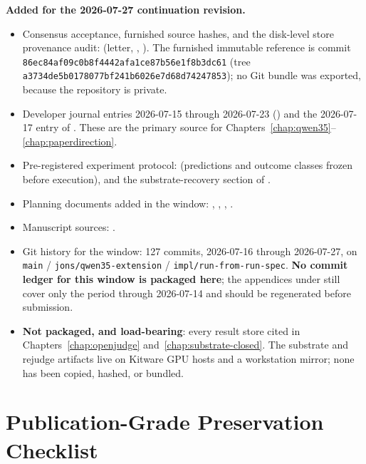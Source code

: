 \documentclass[11pt]{report}
\newcommand{\code}[1]{\texttt{#1}}
\begin{document}
\noindent\textbf{Added for the 2026-07-27 continuation revision.}
\begin{itemize}
  \item Consensus acceptance, furnished source hashes, and the disk-level store
        provenance audit: 
        (letter, ,
        ). The furnished immutable
        reference is commit
        \code{86ec84af09c0b8f4442afa1ce87b56e1f8b3dc61} (tree
        \code{a3734de5b0178077bf241b6026e7d68d74247853}); no Git bundle was exported,
        because the repository is private.
  \item Developer journal entries 2026-07-15 through 2026-07-23
        () and the 2026-07-17 entry of
        . These are the primary source for
        Chapters~\ref{chap:qwen35}--\ref{chap:paperdirection}.
  \item Pre-registered experiment protocol:
        (predictions and outcome classes frozen before execution), and the
        substrate-recovery section of
        .
  \item Planning documents added in the window: ,
        , ,
        .
  \item Manuscript sources: .
  \item Git history for the window: 127 commits, 2026-07-16 through 2026-07-27, on
        \code{main} / \code{jons/qwen35-extension} / \code{impl/run-from-run-spec}.
        \textbf{No commit ledger for this window is packaged here}; the appendices
        under  still cover only the period through
        2026-07-14 and should be regenerated before submission.
  \item \textbf{Not packaged, and load-bearing}: every result store cited in
        Chapters~\ref{chap:openjudge} and~\ref{chap:substrate-closed}. The
        substrate and rejudge artifacts live on Kitware GPU hosts and a workstation
        mirror; none has been copied, hashed, or bundled.
\end{itemize}

\chapter{Publication-Grade Preservation Checklist}
\end{document}
